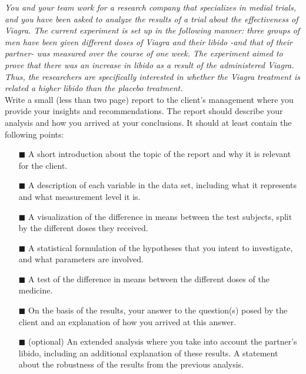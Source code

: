 \textit{You and your team work for a research company that specializes in medial trials, and you have been asked to analyze the results of a trial about the effectiveness of Viagra. The current experiment is set up in the following manner: three groups of men have been given different doses of Viagra and their libido -and that of their partner- was measured over the course of one week. The experiment aimed to prove that there was an increase in libido as a result of the administered Viagra. Thus, the researchers are specifically interested in whether the Viagra treatment is related a higher libido than the placebo treatment.} \\

Write a small (less than two page) report to the client's management where you provide your insights and recommendations. The report should describe your analysis and how you arrived at your conclusions. It should at least contain the following points: \\

\begin{itemize}
    \item[$\blacksquare$] A short introduction about the topic of the report and why it is relevant for the client.
    \item[$\blacksquare$] A description of each variable in the data set, including what it represents and what measurement level it is.  
    \item[$\blacksquare$] A visualization of the difference in means between the test subjects, split by the different doses they received.
    \item[$\blacksquare$] A statistical formulation of the hypotheses that you intent to investigate, and what parameters are involved.
    \item[$\blacksquare$] A test of the difference in means between the different doses of the medicine.
    \item[$\blacksquare$] On the basis of the results, your answer to the question(s) posed by the client and an explanation of how you arrived at this answer.
    \item[$\blacksquare$] (optional) An extended analysis where you take into account the partner's libido, including an additional explanation of these results. A statement about the robustness of the results from the previous analysis.
\end{itemize}

\clearpage %